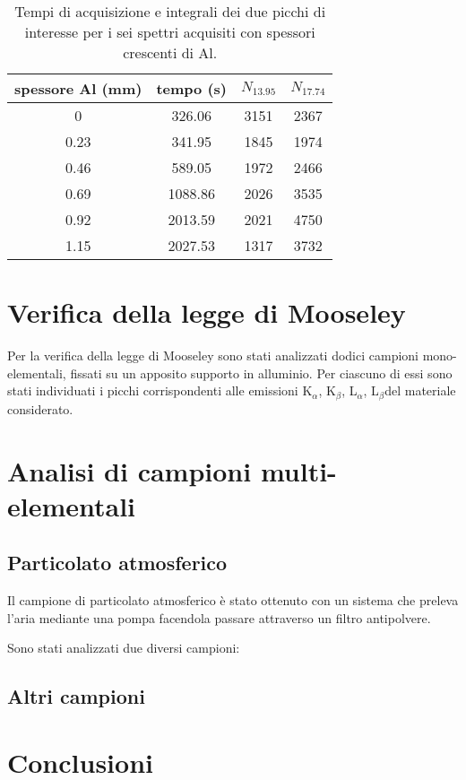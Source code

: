 \documentclass[italian,a4paper]{article}
\renewcommand{\a}{$_{\alpha}$}
\renewcommand{\b}{$_{\beta}$}
\begin{document}
\begin{table}[h!]\centering
\begin{tabular}{*4c}
spessore Al (mm)&		tempo (s)&	$N_{13.95}$&		$N_{17.74}$\\\hline
0&					326.06&		3151&			2367\\
0.23&				341.95&		1845&			1974\\
0.46&				589.05&		1972&			2466\\
0.69&				1088.86&		2026&			3535\\
0.92&				2013.59&		2021&			4750\\
1.15&				2027.53&		1317&			3732
\end{tabular}
\caption{Tempi di acquisizione e integrali dei due picchi di interesse per i sei spettri acquisiti con spessori crescenti di Al.}\label{assorb}
\end{table}

\section{Verifica della legge di Mooseley}
Per la verifica della legge di Mooseley sono stati analizzati dodici campioni mono-elementali, fissati su un apposito supporto in alluminio.
Per ciascuno di essi sono stati individuati i picchi corrispondenti alle emissioni K\a, K\b, L\a, L\b del materiale considerato.


\section{Analisi di campioni multi-elementali}
\subsection*{Particolato atmosferico}
Il campione di particolato atmosferico è stato ottenuto con un sistema che preleva l'aria mediante una pompa facendola passare attraverso un filtro antipolvere.

Sono stati analizzati due diversi campioni:


\subsection*{Altri campioni}

\section{Conclusioni}

\clearpage
\end{document}

